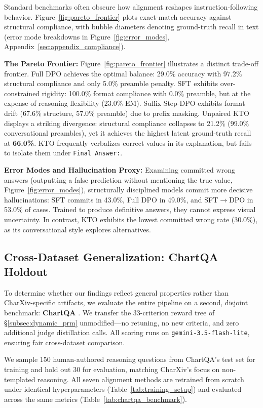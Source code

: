 \documentclass[11pt]{article}
\begin{document}
Standard benchmarks often obscure how alignment reshapes instruction-following behavior. Figure~\ref{fig:pareto_frontier} plots exact-match accuracy against structural compliance, with bubble diameters denoting ground-truth recall in text (error mode breakdowns in Figure~\ref{fig:error_modes}, Appendix~\ref{sec:appendix_compliance}).

\textbf{The Pareto Frontier:} Figure~\ref{fig:pareto_frontier} illustrates a distinct trade-off frontier. Full DPO achieves the optimal balance: 29.0\% accuracy with 97.2\% structural compliance and only 5.0\% preamble penalty. SFT exhibits over-constrained rigidity: 100.0\% format compliance with 0.0\% preamble, but at the expense of reasoning flexibility (23.0\% EM). Suffix Step-DPO exhibits format drift (67.6\% structure, 57.0\% preamble) due to prefix masking. Unpaired KTO displays a striking divergence: structural compliance collapses to 21.2\% (99.0\% conversational preambles), yet it achieves the highest latent ground-truth recall at \textbf{66.0\%}. KTO frequently verbalizes correct values in its explanation, but fails to isolate them under \texttt{Final Answer:}.

\textbf{Error Modes and Hallucination Proxy:} Examining committed wrong answers (outputting a false prediction without mentioning the true value, Figure~\ref{fig:error_modes}), structurally disciplined models commit more decisive hallucinations: SFT commits in 43.0\%, Full DPO in 49.0\%, and SFT$\rightarrow$DPO in 53.0\% of cases. Trained to produce definitive answers, they cannot express visual uncertainty. In contrast, KTO exhibits the lowest committed wrong rate (30.0\%), as its conversational style explores alternatives.

\subsection{Cross-Dataset Generalization: ChartQA Holdout}
\label{subsec:chartqa_generalization}

To determine whether our findings reflect general properties rather than CharXiv-specific artifacts, we evaluate the entire pipeline on a second, disjoint benchmark: \textbf{ChartQA} \citep{masry2022chartqa}. We transfer the 33-criterion reward tree of \S\ref{subsec:dynamic_prm} unmodified---no retuning, no new criteria, and zero additional judge distillation calls. All scoring runs on \texttt{gemini-3.5-flash-lite}, ensuring fair cross-dataset comparison.

We sample 150 human-authored reasoning questions from ChartQA's test set for training and hold out 30 for evaluation, matching CharXiv's focus on non-templated reasoning. All seven alignment methods are retrained from scratch under identical hyperparameters (Table~\ref{tab:training_setup}) and evaluated across the same metrics (Table~\ref{tab:chartqa_benchmark}).
\end{document}
